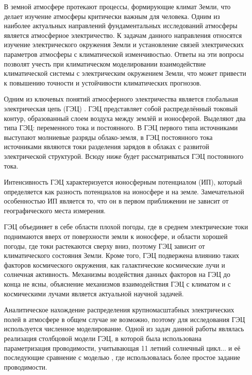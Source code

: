
В земной атмосфере протекают процессы, формирующие климат Земли, что делает изучение атмосферы критически важным для человека. Одним из наиболее актуальных направлений фундаментальных исследований атмосферы является атмосферное электричество. К задачам данного направления относятся изучение электрического окружения Земли и установление связей электрических параметров атмосферы с климатической изменчивостью. Ответы на эти вопросы позволят учесть при климатическом моделировании взаимодействие климатической системы с электрическим окружением Земли, что может привести к повышению точности и устойчивости климатических прогнозов.

Одним из ключевых понятий атмосферного электричества является глобальная электрическая цепь (ГЭЦ) \cite{Williams_Mareev_2014}. ГЭЦ представляет собой распределённый токовый контур, образованный слоем воздуха между землёй и ионосферой. Выделяют два типа ГЭЦ: переменного тока и постоянного. В ГЭЦ первого типа источниками выступают молниевые разряды облако-земля, в ГЭЦ постоянного тока источниками являются токи разделения зарядов в облаках с развитой электрической структурой. Всюду ниже будет рассматриваться ГЭЦ постоянного тока.

Интенсивность ГЭЦ характеризуется ионосферным потенциалом (ИП), который определяется как разность потенциалов на ионосфере и на земле. Замечательной особенностью ИП является то, что он в первом приближении не зависит от географического места измерения.

ГЭЦ объединяет в себе области плохой погоды, где в среднем электрические токи поднимаются вверх от поверхности земли к ионосфере, и области хорошей погоды, где токи растекаются сверху вниз, поэтому ГЭЦ зависит от климатического состояния Земли. Кроме того, ГЭЦ подвержена влиянию таких факторов космического окружения, как галактические космические лучи и солнечная активность. Механизмы воздействия данных факторов на ГЭЦ до конца не ясны, объяснение механизмов взаимодействия ГЭЦ с климатом и с космическими лучами является актуальной научной задачей.

Аналитическое нахождение распределения крупномасштабных электрических полей в атмосфере в общем случае не возможно, поэтому для исследования ГЭЦ используется численное моделирование. Одной из задач данной работы являлась реализация столбцовой модели ГЭЦ, в которой была использована параметризация проводимости, учитывающая 11 летний солнечный цикл... и её последующие сравнение с моделью \cite{Ilin_et_al_2020}, где использовалась более простое задание проводимости.

